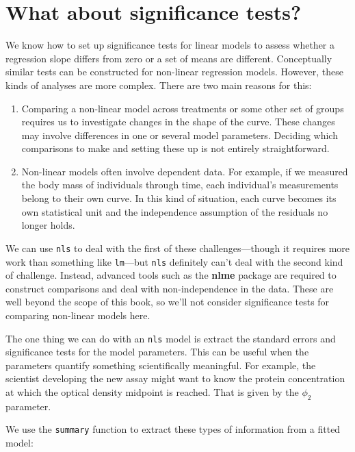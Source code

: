 \documentclass[
]{book}
\begin{document}
\hypertarget{what-about-significance-tests}{%
\section{What about significance tests?}\label{what-about-significance-tests}}

We know how to set up significance tests for linear models to assess whether a regression slope differs from zero or a set of means are different. Conceptually similar tests can be constructed for non-linear regression models. However, these kinds of analyses are more complex. There are two main reasons for this:

\begin{enumerate}
\def\labelenumi{\arabic{enumi}.}
\item
  Comparing a non-linear model across treatments or some other set of groups requires us to investigate changes in the shape of the curve. These changes may involve differences in one or several model parameters. Deciding which comparisons to make and setting these up is not entirely straightforward.
\item
  Non-linear models often involve dependent data. For example, if we measured the body mass of individuals through time, each individual's measurements belong to their own curve. In this kind of situation, each curve becomes its own statistical unit and the independence assumption of the residuals no longer holds.
\end{enumerate}

We can use \texttt{nls} to deal with the first of these challenges---though it requires more work than something like \texttt{lm}---but \texttt{nls} definitely can't deal with the second kind of challenge. Instead, advanced tools such as the \textbf{nlme} package are required to construct comparisons and deal with non-independence in the data. These are well beyond the scope of this book, so we'll not consider significance tests for comparing non-linear models here.

The one thing we can do with an \texttt{nls} model is extract the standard errors and significance tests for the model parameters. This can be useful when the parameters quantify something scientifically meaningful. For example, the scientist developing the new assay might want to know the protein concentration at which the optical density midpoint is reached. That is given by the \(\phi_2\) parameter.

We use the \texttt{summary} function to extract these types of information from a fitted model:
\end{document}
